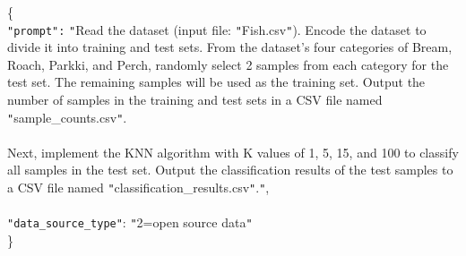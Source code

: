 \begin{tcolorbox}[colback=blue!5!white, colframe=blue!75!black, title=Easy-level Prompt \#1:, text width=\textwidth]
\{ \\
    \texttt{"prompt":} \texttt{"}Read the dataset (input file: \texttt{"}Fish.csv\texttt{"}). Encode the dataset to divide it into training and test sets. From the dataset's four categories of Bream, Roach, Parkki, and Perch, randomly select 2 samples from each category for the test set. The remaining samples will be used as the training set. Output the number of samples in the training and test sets in a CSV file named \texttt{"}sample\_counts.csv\texttt{"}.\\ \\ Next, implement the KNN algorithm with K values of 1, 5, 15, and 100 to classify all samples in the test set. Output the classification results of the test samples to a CSV file named \texttt{"}classification\_results.csv\texttt{"}.\texttt{"}, 
    \\
    \\
    \texttt{"data\_source\_type"}: \texttt{"}2=open source data\texttt{"}
\\
\}
\end{tcolorbox}